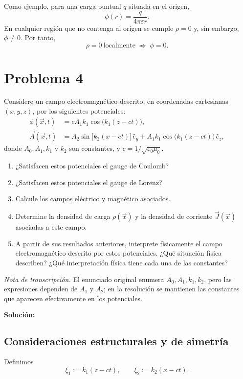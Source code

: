 \documentclass{article}
\numberwithin{equation}{section}
\begin{document}
Como ejemplo, para una carga puntual $q$ situada en el origen,
\begin{equation}
    \phi(r)=\frac{q}{4\pi\varepsilon r}.
\end{equation}
En cualquier región que no contenga al origen se cumple $\rho=0$ y, sin embargo, $\phi\neq0$. Por tanto,
\begin{equation}
    \boxed{\rho=0\ \text{localmente}\;\not\Rightarrow\;\phi=0.}
\end{equation}

\newpage
\section{Problema 4}
Considere un campo electromagnético descrito, en coordenadas cartesianas $(x,y,z)$, por los siguientes potenciales:
\begin{align}
\phi(\vec x,t)&=cA_1k_1\cos\big(k_1(z-ct)\big),\\
\vec A(\vec x,t)&=A_2\sin\big[k_2(x-ct)\big]\,\hat e_y+A_1k_1\cos\big(k_1(z-ct)\big)\,\hat e_z,
\end{align}
donde $A_0,A_1,k_1$ y $k_2$ son constantes, y $c=1/\sqrt{\varepsilon_0\mu_0}$.
\begin{enumerate}[label=(\alph*)]
\item ¿Satisfacen estos potenciales el gauge de Coulomb?
\item ¿Satisfacen estos potenciales el gauge de Lorenz?
\item Calcule los campos eléctrico y magnético asociados.
\item Determine la densidad de carga $\rho(\vec x)$ y la densidad de corriente $\vec J(\vec x)$ asociadas a este campo.
\item A partir de sus resultados anteriores, interprete físicamente el campo electromagnético descrito por estos potenciales. ¿Qué situación física describen? ¿Qué interpretación física tiene cada una de las constantes?
\end{enumerate}
\emph{Nota de transcripción.} El enunciado original enumera $A_0,A_1,k_1,k_2$, pero las expresiones dependen de $A_1$ y $A_2$; en la resolución se mantienen las constantes que aparecen efectivamente en los potenciales.

\textbf{Solución:}
\subsection{Consideraciones estructurales y de simetría}
Definimos
\begin{equation}
\xi_1:=k_1(z-ct),
\qquad
\xi_2:=k_2(x-ct).
\end{equation}
\end{document}
